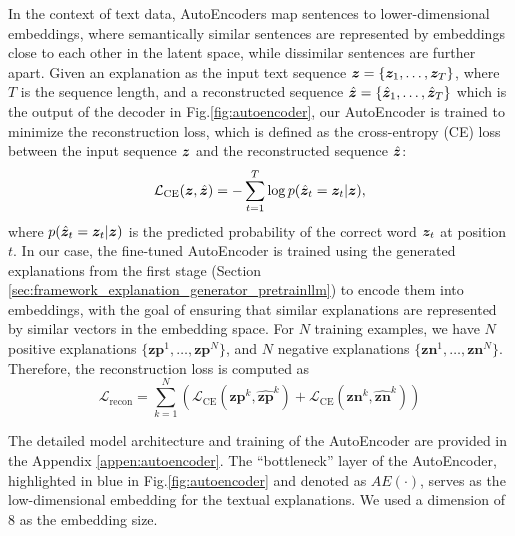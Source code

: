 In the context of text data, AutoEncoders map sentences to lower-dimensional embeddings, where semantically similar sentences are represented by embeddings close to each other in the latent space, while dissimilar sentences are further apart. Given an explanation as the input text sequence \( {\bm{z}} = \{{\bm{z}}_1, \dots, {\bm{z}}_T\} \), where \( T \) is the sequence length, and a reconstructed sequence \( \hat{{\bm{z}}} = \{\hat{{\bm{z}}}_1, \dots, \hat{{\bm{z}}}_T\} \) which is the output of the decoder in Fig.\ref{fig:autoencoder}, our AutoEncoder is trained to minimize the reconstruction loss, which is defined as the cross-entropy (CE) loss between the input sequence ${\bm{z}}$ and the reconstructed sequence $\hat{{\bm{z}}}$:
\begin{equation}
\label{eq:reconstruction_loss_pop}
\mathcal{L}_{\text{CE}}({\bm{z}}, \hat{{\bm{z}}}) = - \sum_{t=1}^{T} \log p(\hat{{\bm{z}}}_t = {\bm{z}}_t | {\bm{z}}),
\end{equation}
where $p(\hat{{\bm{z}}}_t = {\bm{z}}_t | {\bm{z}})$ is the predicted probability of the correct word ${\bm{z}}_t$ at position $t$. In our case, the fine-tuned AutoEncoder is trained using the generated explanations from the first stage (Section \ref{sec:framework_explanation_generator_pretrainllm}) to encode them into embeddings, with the goal of ensuring that similar explanations are represented by similar vectors in the embedding space. For $N$ training examples, we have $N$ positive explanations $\{\bm{zp}^1, \dots, \bm{zp}^N\}$, and $N$ negative explanations $\{\bm{zn}^1, \dots, \bm{zn}^N\}$. Therefore, the reconstruction loss is computed as 
\begin{equation}
\label{eq:reconstruction_loss_sample}
\mathcal{L}_{\text{recon}}  = \sum_{k=1}^N \left(\mathcal{L}_{\text{CE}}(\bm{zp}^k, \hat{\bm{zp}}^k) + \mathcal{L}_{\text{CE}}(\bm{zn}^k, \hat{\bm{zn}}^k)\right) 
\end{equation}


The detailed model architecture and training of the AutoEncoder are provided in the Appendix \ref{appen:autoencoder}. The ``bottleneck'' layer of the AutoEncoder, highlighted in blue in Fig.\ref{fig:autoencoder} and denoted as $AE(\cdot)$, serves as the low-dimensional embedding for the textual explanations. We used a dimension of 8 as the embedding size. 

